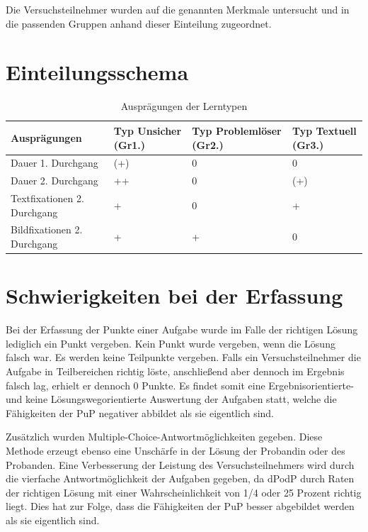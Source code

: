 Die Versuchsteilnehmer wurden auf die genannten Merkmale untersucht und in die passenden Gruppen anhand dieser Einteilung zugeordnet.
\section*{Einteilungsschema}

\begin{table}[H]
\hspace{-5pt}
\begin{tabularx}{\textwidth + 5pt}{| @{\hspace{3pt}} M || @{\hspace{3pt}} M  | @{\hspace{3pt}} M  | @{\hspace{3pt}} M |}
\hline
\textbf{Ausprägungen} & \textbf{Typ Unsicher (Gr1.)} & \textbf{Typ Problemlöser (Gr2.)} & \textbf{Typ Textuell (Gr3.)}\\
\hline
\hline
Dauer 1. Durchgang          & (+) & 0 & 0\\
\hline
Dauer 2. Durchgang          & ++ & 0 & (+)\\
\hline
Textfixationen 2. Durchgang & + & 0 & +\\
\hline
Bildfixationen 2. Durchgang & + & + & 0\\
\hline
\end{tabularx}
\caption{Ausprägungen der Lerntypen}
\end{table}



\section{Schwierigkeiten bei der Erfassung}

Bei der Erfassung der Punkte einer Aufgabe wurde im Falle der richtigen Lösung lediglich ein Punkt vergeben. Kein Punkt wurde vergeben, wenn die Lösung falsch war. Es werden keine Teilpunkte vergeben. Falls ein Versuchsteilnehmer die Aufgabe in Teilbereichen richtig löste, anschließend aber dennoch im Ergebnis falsch lag, erhielt er dennoch 0 Punkte. Es findet somit eine Ergebnisorientierte- und keine Lösungswegorientierte Auswertung der Aufgaben statt, welche die Fähigkeiten der \gls{PuP} negativer abbildet als sie eigentlich sind.

Zusätzlich wurden Multiple-Choice-Antwortmöglichkeiten gegeben. Diese Methode erzeugt ebenso eine Unschärfe in der Lösung der Probandin oder des Probanden. Eine Verbesserung der Leistung des Versuchsteilnehmers wird durch die vierfache Antwortmöglichkeit der Aufgaben gegeben, da \gls{dPodP} durch Raten der richtigen Lösung mit einer Wahrscheinlichkeit von 1/4 oder 25 Prozent richtig liegt. Dies hat zur Folge, dass die Fähigkeiten der \gls{PuP} besser abgebildet werden als sie eigentlich sind.  

